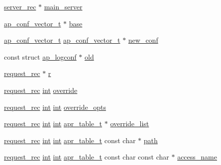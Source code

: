\begin{DoxyCompactItemize}
\item 
\hyperlink{structserver__rec}{server\+\_\+rec} $\ast$ \hyperlink{group__APACHE__CORE__CONFIG_ga2e75076017a456eca3d9cb2098e66fbb}{main\+\_\+server}
\item 
\hyperlink{group__APACHE__CORE__CONFIG_ga614684670dbf748a70ac6bad272da59c}{ap\+\_\+conf\+\_\+vector\+\_\+t} $\ast$ \hyperlink{group__APACHE__CORE__CONFIG_ga4f273a965cc36c5abc3b82c390914c29}{base}
\item 
\hyperlink{group__APACHE__CORE__CONFIG_ga614684670dbf748a70ac6bad272da59c}{ap\+\_\+conf\+\_\+vector\+\_\+t} \hyperlink{group__APACHE__CORE__CONFIG_ga614684670dbf748a70ac6bad272da59c}{ap\+\_\+conf\+\_\+vector\+\_\+t} $\ast$ \hyperlink{group__APACHE__CORE__CONFIG_gaceda73e293d0957789ffb6b971897fe6}{new\+\_\+conf}
\item 
const struct \hyperlink{structap__logconf}{ap\+\_\+logconf} $\ast$ \hyperlink{group__APACHE__CORE__CONFIG_gad4a381169ca3769e4a31a6fdca479660}{old}
\item 
\hyperlink{structrequest__rec}{request\+\_\+rec} $\ast$ \hyperlink{group__APACHE__CORE__CONFIG_ga091cdd45984e865a888a4f8bb8fe107a}{r}
\item 
\hyperlink{structrequest__rec}{request\+\_\+rec} \hyperlink{pcre_8txt_a42dfa4ff673c82d8efe7144098fbc198}{int} \hyperlink{group__APACHE__CORE__CONFIG_gada833e2a43b3b92346c3c4de408320e3}{override}
\item 
\hyperlink{structrequest__rec}{request\+\_\+rec} \hyperlink{pcre_8txt_a42dfa4ff673c82d8efe7144098fbc198}{int} \hyperlink{pcre_8txt_a42dfa4ff673c82d8efe7144098fbc198}{int} \hyperlink{group__APACHE__CORE__CONFIG_gaac34137ee845a8a75f5e537b55b1110a}{override\+\_\+opts}
\item 
\hyperlink{structrequest__rec}{request\+\_\+rec} \hyperlink{pcre_8txt_a42dfa4ff673c82d8efe7144098fbc198}{int} \hyperlink{pcre_8txt_a42dfa4ff673c82d8efe7144098fbc198}{int} \hyperlink{structapr__table__t}{apr\+\_\+table\+\_\+t} $\ast$ \hyperlink{group__APACHE__CORE__CONFIG_ga008f2f7405a84ce66b69e3f4e9ab0843}{override\+\_\+list}
\item 
\hyperlink{structrequest__rec}{request\+\_\+rec} \hyperlink{pcre_8txt_a42dfa4ff673c82d8efe7144098fbc198}{int} \hyperlink{pcre_8txt_a42dfa4ff673c82d8efe7144098fbc198}{int} \hyperlink{structapr__table__t}{apr\+\_\+table\+\_\+t} const char $\ast$ \hyperlink{group__APACHE__CORE__CONFIG_gab559cff0ba49c0f92a0dc777d5730496}{path}
\item 
\hyperlink{structrequest__rec}{request\+\_\+rec} \hyperlink{pcre_8txt_a42dfa4ff673c82d8efe7144098fbc198}{int} \hyperlink{pcre_8txt_a42dfa4ff673c82d8efe7144098fbc198}{int} \hyperlink{structapr__table__t}{apr\+\_\+table\+\_\+t} const char const char $\ast$ \hyperlink{group__APACHE__CORE__CONFIG_gafa31c3d88dbb28bba9163c1ebcaab7a8}{access\+\_\+name}

\end{DoxyCompactItemize}
